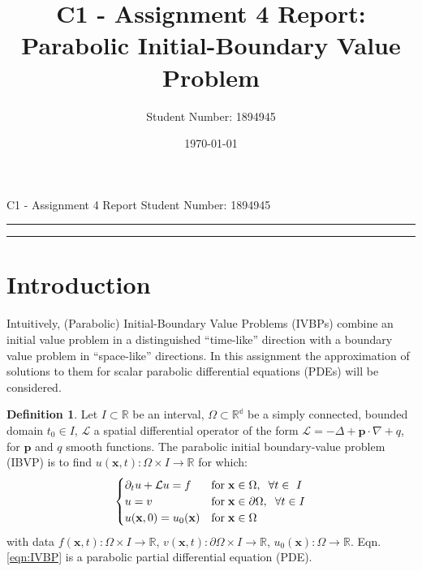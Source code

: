 \documentclass[11pt]{article}
\title{C1 - Assignment 4 Report: Parabolic Initial-Boundary Value Problem} %
\author{Student Number: 1894945} %
\date{\today} %
\theoremstyle{theorem}
\theoremstyle{definition}
\newtheorem{definition}{Definition}
\begin{document}
\maketitle %

\begin{center}
C1 - Assignment 4 Report \hfill
Student Number: 1894945
\vspace{3pt} \hrule \vspace{3pt} \hrule
\end{center}

\tableofcontents

\clearpage



\section{Introduction}
Intuitively, (Parabolic) Initial-Boundary Value Problems (IVBPs) combine an initial value problem in a distinguished “time-like” direction with a boundary value
problem in “space-like” directions. In this assignment the approximation of solutions to them for scalar parabolic differential equations (PDEs) will be considered.

\begin{definition}
	\label{def:IVBP}
	Let $I\subset\mathbb{R}$ be an interval, $\Omega\subset\mathbb{R^d}$ be a simply connected, bounded domain $t_0\in I$, $\mathcal{L}$ a spatial differential operator of the form $\mathcal{L}=-\Delta+\mathbf{p}\cdot\nabla+q$, for $\mathbf{p}$ and $q$ smooth functions. The parabolic initial boundary-value problem (IBVP) is to find $u(\mathbf{x},t):\Omega\times I\to\mathbb{R}$ for which:
	\begin{align}
		\label{eqn:IVBP}
		\begin{cases}
		\partial_t u+\mathcal{L}u=f &\text{for}\hspace{1mm}\mathbf{x}\in\Omega,\hspace{2mm}\forall t\in\ I\\
		u=v &\text{for}\hspace{1mm}\mathbf{x}\in\partial\Omega,\hspace{2mm}\forall t\in I\\
		u(\mathbf{x},0)=u_0(\mathbf{x}) &\text{for}\hspace{1mm}\mathbf{x}\in\Omega
		\end{cases}
	\end{align} 
	with data $f(\mathbf{x},t):\Omega\times I\to\mathbb{R}$, $v(\mathbf{x},t):\partial\Omega\times I\to\mathbb{R}$, $u_0(\mathbf{x}):\Omega\to\mathbb{R}$. Eqn.\eqref{eqn:IVBP} is a parabolic partial differential equation (PDE).\\
\end{definition}
\end{document}
